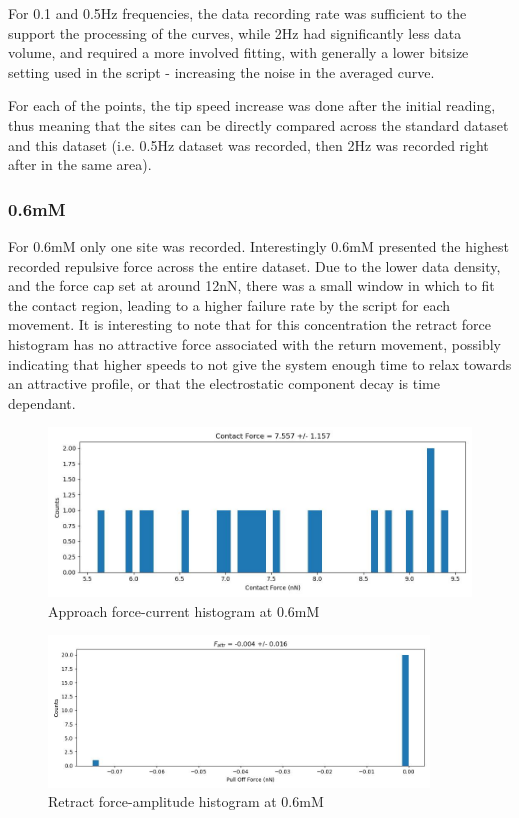 For 0.1 and 0.5Hz frequencies, the data recording rate was sufficient to the support the processing of the curves, while 2Hz had significantly less data volume, and required a more involved fitting, with generally a lower bitsize setting used in the script - increasing the noise in the averaged curve.

For each of the points, the tip speed increase was done after the initial reading, thus meaning that the sites can be directly compared across the standard dataset and this dataset (i.e. 0.5Hz dataset was recorded, then 2Hz was recorded right after in the same area).

\subsubsection*{0.6mM}
For 0.6mM only one site was recorded. Interestingly 0.6mM presented the highest recorded repulsive force across the entire dataset. Due to the lower data density, and the force cap set at around 12nN, there was a small window in which to fit the contact region, leading to a higher failure rate by the script for each movement. It is interesting to note that for this concentration the retract force histogram has no attractive force associated with the return movement, possibly indicating that higher speeds to not give the system enough time to relax towards an attractive profile, or that the electrostatic component decay is time dependant.
\begin{figure}[h!]
\centering
\includegraphics[width=\textwidth]{chapter7/Tip speed/0.6mM/approach_f_c_hist.jpg}
\caption{Approach force-current histogram at 0.6mM}
\end{figure}

\begin{figure}[h!]
\centering
\includegraphics[width=0.9\textwidth]{chapter7/Tip speed/0.6mM/retract_f_a_hist.jpg}
\caption{Retract force-amplitude histogram at 0.6mM}
\end{figure}

